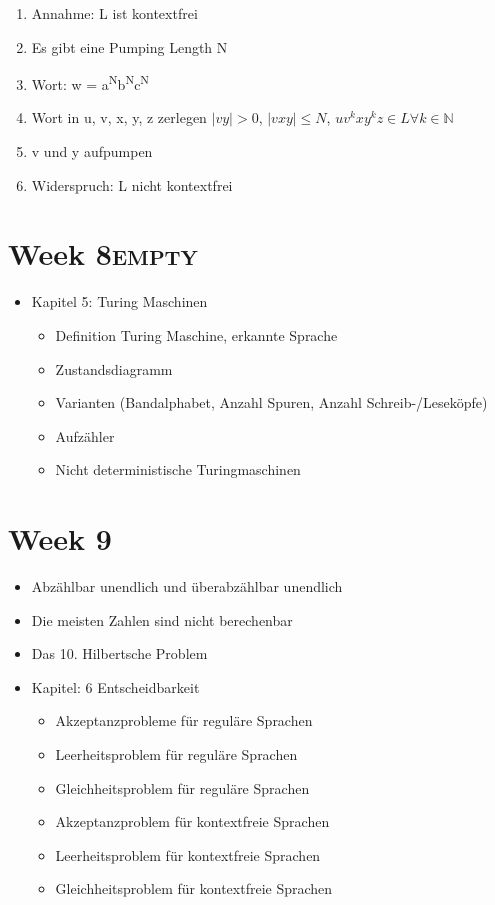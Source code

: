 \documentclass[11pt,twoside,landscape]{article}
\begin{document}
\begin{multicols}{3}
\begin{enumerate}
\item Annahme: L ist kontextfrei
\item Es gibt eine Pumping Length N
\item Wort: w = a\textsuperscript{N}b\textsuperscript{N}c\textsuperscript{N}
\item Wort in u, v, x, y, z zerlegen
\(|vy| > 0\), \(|vxy| \leq N\), \(uv^kxy^kz \in L \forall k \in \mathbb{N}\)
\item v und y aufpumpen
\item Widerspruch: L nicht kontextfrei
\end{enumerate}

\section*{Week 8\hfill{}\textsc{empty}}
\label{sec:orga04f58d}
\begin{itemize}
\item Kapitel 5: Turing Maschinen
\begin{itemize}
\item Definition Turing Maschine, erkannte Sprache
\item Zustandsdiagramm
\item Varianten (Bandalphabet, Anzahl Spuren, Anzahl Schreib-/Leseköpfe)
\item Aufzähler
\item Nicht deterministische Turingmaschinen
\end{itemize}
\end{itemize}


\section*{Week 9}
\label{sec:org4719e98}
\begin{itemize}
\item Abzählbar unendlich und überabzählbar unendlich
\item Die meisten Zahlen sind nicht berechenbar
\item Das 10. Hilbertsche Problem

\item Kapitel: 6 Entscheidbarkeit
\begin{itemize}
\item Akzeptanzprobleme für reguläre Sprachen
\item Leerheitsproblem für reguläre Sprachen
\item Gleichheitsproblem für reguläre Sprachen
\item Akzeptanzproblem für kontextfreie Sprachen
\item Leerheitsproblem für kontextfreie Sprachen
\item Gleichheitsproblem für kontextfreie Sprachen
\end{itemize}


\end{itemize}
\end{multicols}
\end{document}
